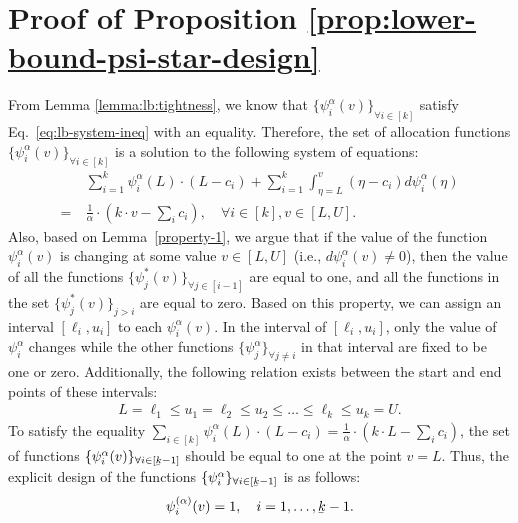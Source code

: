 \section{Proof of Proposition \ref{prop:lower-bound-psi-star-design} }
\label{appendix:lower-bound-proof-lemma-function-design-psi-star}
From Lemma \ref{lemma:lb:tightness}, we know that ${\{\psi^{\alpha}_{i}(v)\}}_{\forall i \in [k]} $ satisfy Eq.~\eqref{eq:lb-system-ineq} with an equality. Therefore, the set of allocation functions ${\{\psi^{\alpha}_{i}(v)\}}_{\forall i \in [k]}$ is a solution to the following system of equations: 
\begin{align}
    & \sum_{i=1}^{k} \psi^{\alpha}_{i}(L) \cdot (L - c_{i}) +    \sum_{i=1}^{k} \int_{\eta =L}^{v} (\eta - c_{i} )d\psi^{\alpha}_{i}(\eta)  \nonumber \\
    =\ & \frac{1}{\alpha} \cdot (k\cdot v - \sum_{i} c_{i}), \quad   
    \forall i \in [k], v \in [L,U].  \label{appendix-lower-bound-system-of-eq}
\end{align}
A‌lso, based on Lemma~\ref{property-1}, we argue that if the value of the function $\psi^{\alpha}_{i}(v)$  is changing at some value $v \in [L,U]  $ (i.e., $d\psi^{\alpha}_{i}(v) \not = 0$), then the value of all the functions $\{\psi^{*}_{j}(v)\}_{\forall j \in [i-1]}$ are equal to one, and all the functions in the set $\{\psi^{*}_{j}(v)\}_{j > i}$ are equal to zero. Based on this property, we can assign an interval $[\ell_{i},u_{i}]$ to each $\psi^{\alpha}_{i}(v)$. In the interval of $[\ell_{i},u_{i}]$, only the value of $\psi^{\alpha}_{i}$ changes while the other functions $\{\psi^{\alpha}_{j}\}_{\forall j \not =  i}$ in that interval are fixed to be one or zero. Additionally, the following relation exists between the start and end points of these intervals:
\begin{align*}
    L = \ell_{1} \leq u_{1}=\ell_{2} \leq u_{2}\leq \dots \leq \ell_{k} \leq u_{k} = U.
\end{align*}
To satisfy the equality $\sum_{i \in [k]} \psi^{\alpha}_{i}(L) \cdot (L-c_{i}) = \frac{1}{\alpha} \cdot (k\cdot L - \sum_{i} c_{i}) $, the set of functions $\{\psi^{\alpha}_{i}(v)\}_{\forall i \in [\ubar{k}-1]}$ should be equal to one at the point $v=L$. Thus, the explicit design of the functions $\{\psi^{\alpha}_{i}\}_{\forall i \in [\ubar{k}-1]}$ is as follows:
\begin{align*}
\psi^{(\alpha)}_{i}(v) = 1, \quad    i = 1, \dots, \ubar{k}-1.
\end{align*}

